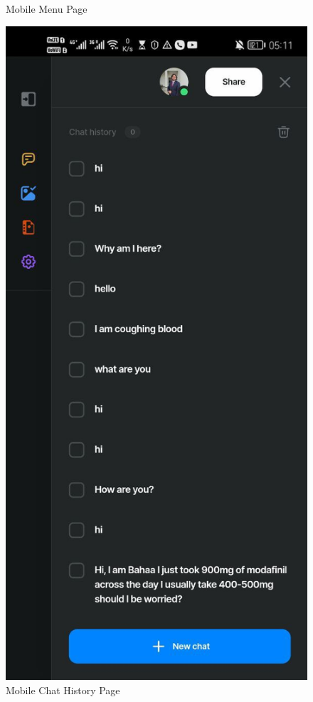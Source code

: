\begin{figure}[htbp]
\begin{minipage}{0.3\textwidth}
        \caption{Mobile Menu Page}
        \label{fig:mobile-menu}
    \end{minipage}\hfill
    \begin{minipage}{0.3\textwidth}
        \centering
        \includegraphics[width=\textwidth]{./Figures/mobile-chat-history.jpg}
        \caption{Mobile Chat History Page}
        \label{fig:mobile-chat-history}
    \end{minipage}
\end{figure}


